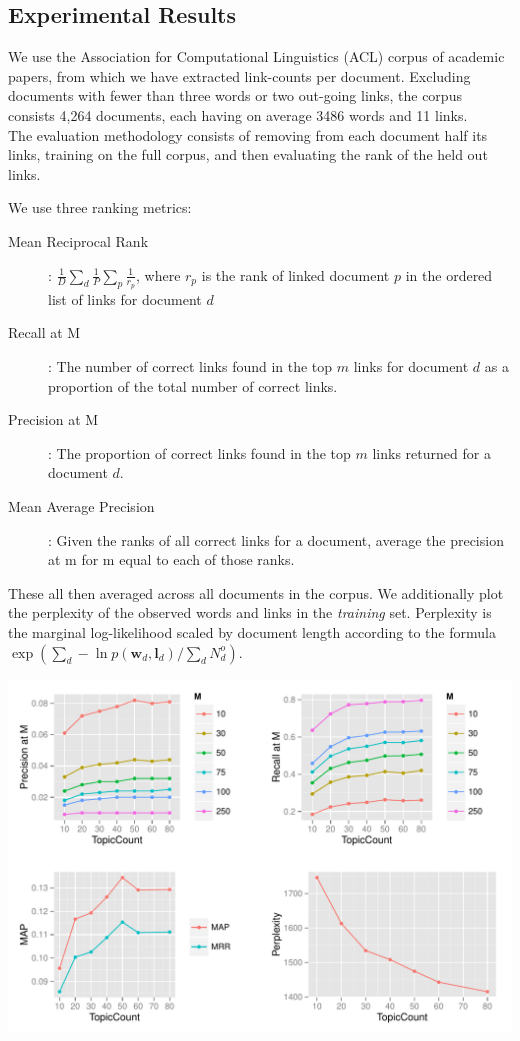 \documentclass{sciposter}
\newcommand \vv[1] { \bm #1 }
\begin{document}
\begin{multicols}{3}
\section{Experimental Results}


We use the Association for Computational Linguistics (ACL) corpus of academic papers, from which we have extracted link-counts per document. Excluding documents with fewer than three words or two out-going links, the corpus consists 4,264 documents, each having on average 3486 words and 11 links. \\

The evaluation methodology consists of removing from each document half its links, training on the full corpus, and then evaluating the rank of the held out links.

We use three ranking metrics:
\begin{description}
\item[Mean Reciprocal Rank]: $\frac{1}{D} \sum_d \frac{1}{P} \sum_p \frac{1}{r_p}$, where $r_p$ is the rank of linked document $p$ in the ordered list of links for document $d$ 
\item[Recall at M]: The number of correct links found in the top $m$ links for document $d$ as a proportion of the total number of correct links. 
\item[Precision at M]: The proportion of correct links found in the top $m$ links returned for a document $d$.
\item[Mean Average Precision]: Given the ranks of all correct links for a document, average the precision at m for m equal to each of those ranks. 
\end{description}
These all then averaged across all documents in the corpus. We additionally plot the perplexity of the observed words and links in the \emph{training} set. Perplexity is the marginal log-likelihood scaled by document length according to the formula $\exp\left(\sum_d -\ln p(\vv{w}_d,\vv{l}_d) / \sum_d N^o_d\right)$.

\includegraphics[scale=1.1]{images/RPlot.pdf}


\end{multicols}
\end{document}
